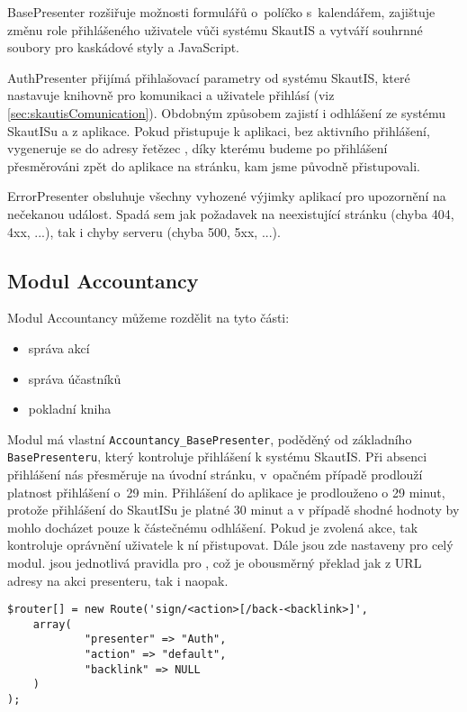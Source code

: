 \documentclass[thesis=B,czech]{FITthesis}[2012/04/27]
\begin{document}
BasePresenter rozšiřuje možnosti formulářů o~políčko s~kalendářem, zajištuje změnu role přihlášeného uživatele vůči systému SkautIS a vytváří souhrnné soubory pro kaskádové styly a JavaScript.

AuthPresenter přijímá přihlašovací parametry od systému SkautIS, které nastavuje knihovně pro komunikaci a uživatele přihlásí (viz \ref{sec:skautisComunication}). Obdobným způsobem zajistí i odhlášení ze systému SkautISu a z aplikace. Pokud přistupuje k aplikaci, bez aktivního přihlášení, vygeneruje se do adresy řetězec , díky kterému budeme po přihlášení přesměrováni zpět do aplikace na stránku, kam jsme původně přistupovali.

ErrorPresenter obsluhuje všechny vyhozené výjimky aplikací pro upozorně\-ní na nečekanou událost. Spadá sem jak požadavek na neexistující stránku (chyba 404, 4xx, ...), tak i chyby serveru (chyba 500, 5xx, ...).

\subsection{Modul Accountancy}

Modul Accountancy můžeme rozdělit na tyto části:
\begin{itemize}
	\item správa akcí
	\item správa účastníků
	\item pokladní kniha
\end{itemize}

Modul má vlastní \texttt{Accountancy\_BasePresenter}, poděděný od základního \texttt{BasePresenteru}, který kontroluje přihlášení k systému SkautIS. Při absenci přihlášení nás přesměruje na úvodní stránku, v~opačném případě prodlouží platnost přihlášení o~29 min. Přihlášení do aplikace je prodlouženo o 29 minut, protože přihlášení do SkautISu je platné 30 minut a v případě shodné hodnoty by mohlo docházet pouze k částečnému odhlášení. Pokud je zvolená akce, tak kontroluje oprávnění uživatele k ní přistupovat. Dále jsou zde nastaveny  pro celý modul.  jsou jednotlivá pravidla pro , což je obousměrný překlad jak z URL adresy na akci presenteru, tak i naopak.


\begin{lstlisting}[caption=routa pro přihlašovací presenter, label=route]
$router[] = new Route('sign/<action>[/back-<backlink>]',
	array(
    		"presenter" => "Auth",
    		"action" => "default",
    		"backlink" => NULL
	)
);
\end{lstlisting}
\end{document}
